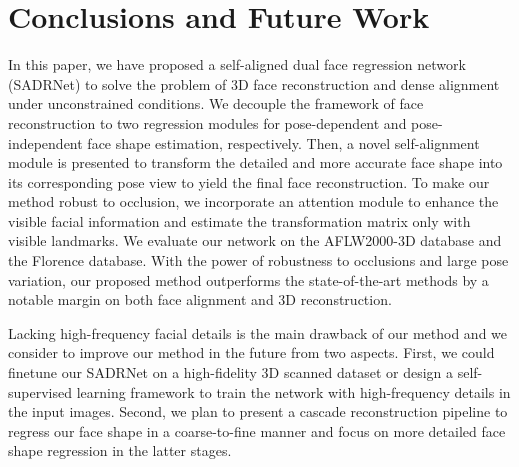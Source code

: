 \documentclass[journal]{IEEEtran}
\begin{document}
	
	
	\section{Conclusions and Future Work}
	In this paper, we have proposed a self-aligned dual face regression network (SADRNet)  to solve the problem of 3D face reconstruction and dense alignment under unconstrained conditions. We decouple the framework of face reconstruction to two regression modules for pose-dependent and pose-independent face shape estimation, respectively. Then, a novel self-alignment module is presented to transform the detailed and more accurate face shape into its corresponding pose view to yield the final face reconstruction. To make our method robust to occlusion, we incorporate an attention module to enhance the visible facial information and estimate the transformation matrix only with visible landmarks. We evaluate our network on the AFLW2000-3D database and the Florence database. With the power of robustness to occlusions and large pose variation, our proposed method outperforms the state-of-the-art methods by a notable margin on both face alignment and 3D reconstruction.
	
	Lacking high-frequency facial details is the main drawback of our method and we consider to improve our method in the future from two aspects.
	First, we could finetune our SADRNet on a high-fidelity 3D scanned dataset or design a self-supervised learning framework to train the network with high-frequency details in the input images. Second, we plan to present a cascade reconstruction pipeline to regress our face shape in a coarse-to-fine manner and focus on more detailed face shape regression in the latter stages.

	
	
	\appendices
	
	
	
	
	
	
	
\end{document}
